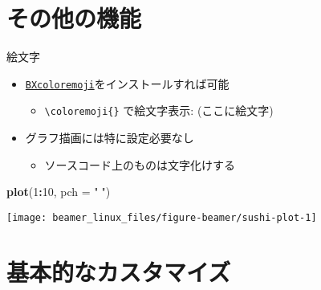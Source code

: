 \documentclass[
  12pt,
  ignorenonframetext,
]{beamer}
\newenvironment{Shaded}{\begin{snugshade}}{\end{snugshade}}
\newcommand{\DataTypeTok}[1]{\textcolor[rgb]{0.13,0.29,0.53}{#1}}
\newcommand{\DecValTok}[1]{\textcolor[rgb]{0.00,0.00,0.81}{#1}}
\newcommand{\KeywordTok}[1]{\textcolor[rgb]{0.13,0.29,0.53}{\textbf{#1}}}
\newcommand{\NormalTok}[1]{#1}
\newcommand{\OperatorTok}[1]{\textcolor[rgb]{0.81,0.36,0.00}{\textbf{#1}}}
\newcommand{\StringTok}[1]{\textcolor[rgb]{0.31,0.60,0.02}{#1}}
\providecommand{\tightlist}{%
  \setlength{\itemsep}{0pt}\setlength{\parskip}{0pt}}
\begin{document}
\hypertarget{ux305dux306eux4ed6ux306eux6a5fux80fd}{%
\section{その他の機能}\label{ux305dux306eux4ed6ux306eux6a5fux80fd}}

\begin{frame}[fragile]{絵文字}
\protect\hypertarget{ux7d75ux6587ux5b57}{}

\begin{itemize}
\tightlist
\item
  \href{https://github.com/zr-tex8r/BXcoloremoji}{\texttt{BXcoloremoji}}をインストールすれば可能

  \begin{itemize}
  \tightlist
  \item
    \texttt{\textbackslash{}coloremoji\{\}} で絵文字表示:
    \ifdefined{} {} \else (ここに絵文字) \fi
  \end{itemize}
\item
  グラフ描画には特に設定必要なし

  \begin{itemize}
  \tightlist
  \item
    ソースコード上のものは文字化けする
  \end{itemize}
\end{itemize}

\begin{Shaded}
\begin{Highlighting}[]
\KeywordTok{plot}\NormalTok{(}\DecValTok{1}\OperatorTok{:}\DecValTok{10}\NormalTok{, }\DataTypeTok{pch =} \StringTok{"🍣"}\NormalTok{)}
\end{Highlighting}
\end{Shaded}

\begin{center}\texttt{[image: beamer\_linux\_files/figure-beamer/sushi-plot-1]} \end{center}

\end{frame}

\hypertarget{ux57faux672cux7684ux306aux30abux30b9ux30bfux30deux30a4ux30ba}{%
\section{基本的なカスタマイズ}\label{ux57faux672cux7684ux306aux30abux30b9ux30bfux30deux30a4ux30ba}}
\end{document}
